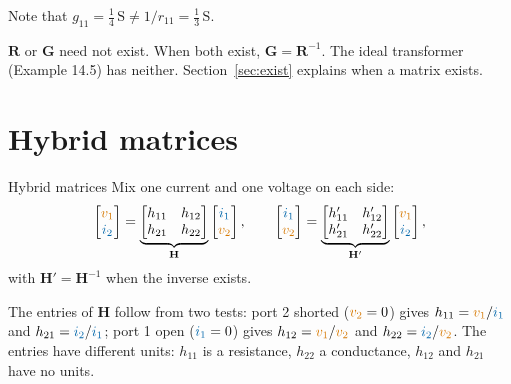 \documentclass[11pt,a4paper]{article}
\newcommand{\Icol}[1]{\textcolor{ccur}{#1}}
\newcommand{\Vcol}[1]{\textcolor{cvolt}{#1}}
\newcommand{\vone}{\Vcol{v_1}}  \newcommand{\vtwo}{\Vcol{v_2}}
\newcommand{\ione}{\Icol{i_1}}  \newcommand{\itwo}{\Icol{i_2}}
\newcommand{\Rm}{\mathbf{R}}  \newcommand{\Gm}{\mathbf{G}}
\newcommand{\Hm}{\mathbf{H}}  \newcommand{\Tm}{\mathbf{T}}
\begin{document}
Note that $g_{11} = \frac14\,\mathrm{S} \neq 1/r_{11} = \frac13\,\mathrm{S}$.

\begin{ideabox}[Remark]
$\Rm$ or $\Gm$ need not exist. When both exist, $\Gm = \Rm^{-1}$. The ideal transformer
(Example 14.5) has neither. Section~\ref{sec:exist} explains when a matrix exists.
\end{ideabox}

\section{Hybrid matrices}

\begin{definitionbox}{Hybrid matrices}
Mix one current and one voltage on each side:
\[
  \begin{bmatrix} \vone\\ \itwo \end{bmatrix}
  = \underbrace{\begin{bmatrix} h_{11} & h_{12}\\ h_{21} & h_{22} \end{bmatrix}}_{\Hm}
    \begin{bmatrix} \ione\\ \vtwo \end{bmatrix},
  \qquad
  \begin{bmatrix} \ione\\ \vtwo \end{bmatrix}
  = \underbrace{\begin{bmatrix} h'_{11} & h'_{12}\\ h'_{21} & h'_{22} \end{bmatrix}}_{\Hm'}
    \begin{bmatrix} \vone\\ \itwo \end{bmatrix},
\]
with $\Hm' = \Hm^{-1}$ when the inverse exists.
\end{definitionbox}

The entries of $\Hm$ follow from two tests: port 2 shorted ($\vtwo = 0$) gives
$h_{11} = \vone/\ione$ and $h_{21} = \itwo/\ione$; port 1 open ($\ione = 0$) gives
$h_{12} = \vone/\vtwo$ and $h_{22} = \itwo/\vtwo$. The entries have different units: $h_{11}$ is
a resistance, $h_{22}$ a conductance, $h_{12}$ and $h_{21}$ have no units.
\end{document}
